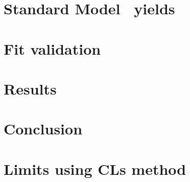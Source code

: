 \documentclass{cmspaper}
\begin{document}
\section{Standard Model \ww\ yields}
   \label{sec:smww}
   
\section{Fit validation}
   \label{sec:validation}
   
\clearpage
\section{Results}
   \label{sec:results}
   
\section{Conclusion}
   
\clearpage

\clearpage
\appendix
\section{Limits using CLs method}
   
\end{document}
